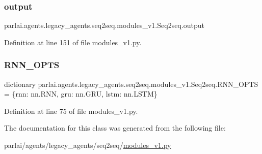 \subsubsection{\texorpdfstring{output}{output}}
{\footnotesize\ttfamily parlai.\+agents.\+legacy\+\_\+agents.\+seq2seq.\+modules\+\_\+v1.\+Seq2seq.\+output}



Definition at line 151 of file modules\+\_\+v1.\+py.

\mbox{\label{classparlai_1_1agents_1_1legacy__agents_1_1seq2seq_1_1modules__v1_1_1Seq2seq_ad1fc7a01d858de2b7b10f805d5891831}} 
\subsubsection{\texorpdfstring{R\+N\+N\+\_\+\+O\+P\+TS}{RNN\_OPTS}}
{\footnotesize\ttfamily dictionary parlai.\+agents.\+legacy\+\_\+agents.\+seq2seq.\+modules\+\_\+v1.\+Seq2seq.\+R\+N\+N\+\_\+\+O\+P\+TS = \{\textquotesingle{}rnn\textquotesingle{}\+: nn.\+R\+NN, \textquotesingle{}gru\textquotesingle{}\+: nn.\+G\+RU, \textquotesingle{}lstm\textquotesingle{}\+: nn.\+L\+S\+TM\}\hspace{0.3cm}{\ttfamily [static]}}



Definition at line 75 of file modules\+\_\+v1.\+py.



The documentation for this class was generated from the following file\+:\begin{DoxyCompactItemize}
\item 
parlai/agents/legacy\+\_\+agents/seq2seq/\hyperlink{modules__v1_8py}{modules\+\_\+v1.\+py}\end{DoxyCompactItemize}
